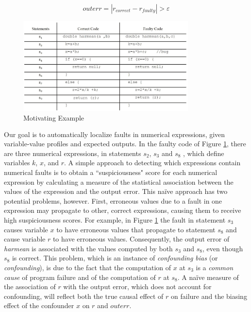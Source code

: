 \begin{equation*}\label{threshold}
outerr = |{r_{correct}} - {r_{faulty}}| > \varepsilon
\end{equation*}

\begin{figure}[!thpb]
\centering
\includegraphics[width=0.8\textwidth]{chapter3_MotivatingExample.pdf}
\caption{Motivating Example}
\label{code}
\end{figure}

Our goal is to automatically localize faults in numerical expressions, given variable-value profiles and expected outputs.  In the faulty code of Figure \ref{code}, there are three numerical expressions, in statements $s_2$, $s_3$ and $s_8$ , which define variables $k$, $ x$, and $r$.  A simple approach to detecting which expressions contain numerical faults is to obtain a ``suspiciousness" score for each numerical expression by calculating a measure of the statistical association between the values of the expression and the output error. This na\"{i}ve approach has two potential problems, however.  First, erroneous values due to a fault in one expression may propagate to other, correct expressions, causing them to receive high suspiciousness scores.  For example, in Figure \ref{code} the fault in statement $s_3$ causes variable $x$ to have erroneous values that propagate to statement $s_8$ and cause variable $r$ to have erroneous values. Consequently, the output error of {\it harmean} is associated with the values computed by both $s_3$ and $s_8$, even though $s_8$  is correct.  This problem, which is an instance of {\it confounding bias} (or {\it confounding}), is due to the fact that the computation of $x$ at $s_3$ is a {\it common cause} of program failure and of the computation of $r$ at $s_8$.  A na\"{i}ve measure of the association of $r$ with the output error, which does not account for confounding, will reflect both the true causal effect of $r$ on failure and the biasing effect of the confounder $x$ on $r$ and $outerr$.

